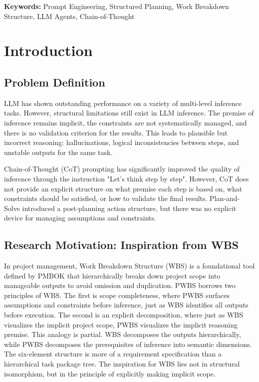 \documentclass[11pt,a4paper]{article}
\begin{document}
\noindent\textbf{Keywords:} Prompt Engineering, Structured Planning, Work Breakdown Structure, LLM Agents, Chain-of-Thought

\newpage
\tableofcontents
\newpage

\section{Introduction}

\subsection{Problem Definition}

LLM has shown outstanding performance on a variety of multi-level inference tasks. However, structural limitations still exist in LLM inference. The premise of inference remains implicit, the constraints are not systematically managed, and there is no validation criterion for the results. This leads to plausible but incorrect reasoning: hallucinations, logical inconsistencies between steps, and unstable outputs for the same task.

Chain-of-Thought (CoT) prompting \citep{wei2022chain} has significantly improved the quality of inference through the instruction "Let's think step by step". However, CoT does not provide an explicit structure on what premise each step is based on, what constraints should be satisfied, or how to validate the final results. Plan-and-Solve \citep{wang2023plan} introduced a post-planning action structure, but there was no explicit device for managing assumptions and constraints.

\subsection{Research Motivation: Inspiration from WBS}

In project management, Work Breakdown Structure (WBS) is a foundational tool defined by PMBOK \citep{pmi2021pmbok} that hierarchically breaks down project scope into manageable outputs to avoid omission and duplication. PWBS borrows two principles of WBS. The first is scope completeness, where PWBS surfaces assumptions and constraints before inference, just as WBS identifies all outputs before execution. The second is an explicit decomposition, where just as WBS visualizes the implicit project scope, PWBS visualizes the implicit reasoning premise. This analogy is partial. WBS decomposes the outputs hierarchically, while PWBS decomposes the prerequisites of inference into semantic dimensions. The six-element structure is more of a requirement specification than a hierarchical task package tree. The inspiration for WBS lies not in structural isomorphism, but in the principle of explicitly making implicit scope.
\end{document}
